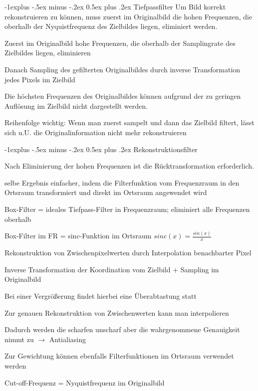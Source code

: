 \documentclass[landscape]{article}
\makeatletter
\renewcommand{\subsection}{\@startsection{subsection}{2}{0mm}%
                                {-1explus -.5ex minus -.2ex}%
                                {0.5ex plus .2ex}%
                                {\normalfont\normalsize\bfseries}}
\makeatother
\begin{document}
\begin{multicols}{3}
  \subsection{Tiefpassfilter}
  Um Bild korrekt rekonstruieren zu können, muss zuerst im Originalbild die hohen Frequenzen, die oberhalb der Nyquistfrequenz des Zielbildes liegen, eliminiert werden.
  \begin{itemize*}
    \item Zuerst im Originalbild hohe Frequenzen, die oberhalb der Samplingrate des Zielbildes liegen, eliminieren
    \item Danach Sampling des gefilterten Originalbildes durch inverse Transformation jedes Pixels im Zielbild
    \item Die höchsten Frequenzen des Originalbildes können aufgrund der zu geringen Auflösung im Zielbild nicht dargestellt werden.
    \item Reihenfolge wichtig: Wenn man zuerst sampelt und dann das Zielbild filtert, lässt sich u.U. die Originalinformation nicht mehr rekonstruieren
  \end{itemize*}
  
  \subsection{Rekonstruktionsfilter}
  \begin{itemize*}
    \item Nach Eliminierung der hohen Frequenzen ist die Rücktransformation erforderlich.
    \item selbe Ergebnis einfacher, indem die Filterfunktion vom Frequenzraum in den Ortsraum transformiert und direkt im Ortsraum angewendet wird
    \item Box-Filter = ideales Tiefpass-Filter in Frequenzraum; eliminiert alle Frequenzen oberhalb
    \item Box-Filter im FR = sinc-Funktion im Ortsraum $sinc(x)=\frac{sin(x)}{x}$
  \end{itemize*}
  
  Rekonstruktion von Zwischenpixelwerten durch Interpolation benachbarter Pixel
  \begin{itemize*}
    \item Inverse Transformation der Koordination vom Zielbild + Sampling im Originalbild
    \item Bei einer Vergrößerung findet hierbei eine Überabtastung statt
    \item Zur genauen Rekonstruktion von Zwischenwerten kann man interpolieren
    \item Dadurch werden die scharfen unscharf aber die wahrgenommene Genauigkeit nimmt zu $\rightarrow$ Antialiasing
    \item Zur Gewichtung können ebenfalls Filterfunktionen im Ortsraum verwendet werden 
    \item Cut-off-Frequenz = Nyquistfrequenz im Originalbild
  \end{itemize*}
  

\end{multicols}
\end{document}
